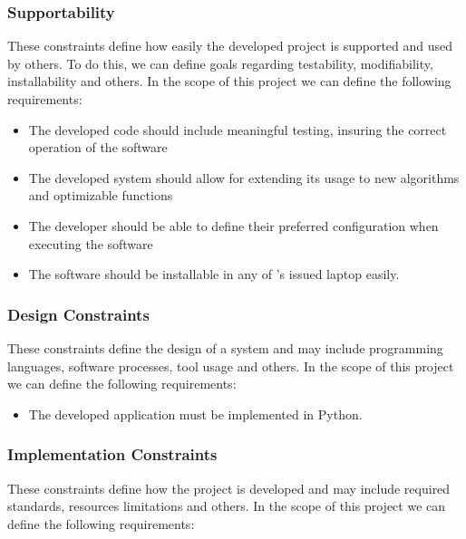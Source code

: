 \subsubsection{Supportability}

These constraints define how easily the developed project is supported and used by others. To do this, we can define goals regarding testability, modifiability, installability and others. In the scope of this project we can define the following requirements:

\begin{itemize}
	\item The developed code should include meaningful testing, insuring the correct operation of the software
	\item The developed system should allow for extending its usage to new algorithms and optimizable functions
	\item The developer should be able to define their preferred configuration when executing the software
	\item The software should be installable in any of \faro's issued laptop easily.
\end{itemize}

\subsubsection{Design Constraints}


These constraints define the design of a system and may include programming languages, software processes, tool usage and others. In the scope of this project we can define the following requirements:

\begin{itemize}
	\item The developed application must be implemented in Python.
\end{itemize}

\subsubsection{Implementation Constraints} 

These constraints define how the project is developed and may include required standards, resources limitations and others. In the scope of this project we can define the following requirements:

